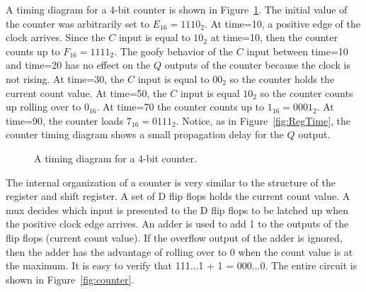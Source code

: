 A timing diagram for a 4-bit counter is shown in Figure~\ref{fig:CountTime}.
The initial value of the counter was arbitrarily set to $E_{16}=1110_2$.
At time=10, a positive edge of the clock arrives.  Since the $C$ input
is equal to $10_2$ at time=10, then the counter counts up to $F_{16}=1111_2$.
The goofy behavior of the $C$ input between time=10 and time=20 has
no effect on the $Q$ outputs of the counter because the clock is not rising.
At time=30, the $C$ input is equal to $00_2$ so the counter holds the current 
count value.  At time=50, the $C$ input is equal $10_2$ so the counter counts up
rolling over to $0_{16}$. At time=70 the counter counts up to $1_{16}=0001_2$.
At time=90, the counter loads $7_{16}=0111_2$.  Notice, as in 
Figure~\ref{fig:RegTime}, the counter timing diagram shows a small 
propagation delay for the $Q$ output.

\begin{figure}[ht]
\caption{A timing diagram for a 4-bit counter.}
\label{fig:CountTime}
\end{figure}

The internal organization of a counter is very similar to the structure of
the register and shift register.  A set of D flip flops holds the current
count value.  A mux decides which input is presented to the D flip flops
to be latched up when the positive clock edge arrives.  An adder is
used to add 1 to the outputs of the flip flops (current count value).  
If the overflow output of the adder is ignored, then the adder has the 
advantage of rolling over to 0 when the count value is at the 
maximum.  It is easy to verify that 111...1 + 1 = 000...0.  The 
entire circuit is shown in Figure~\ref{fig:counter}.

